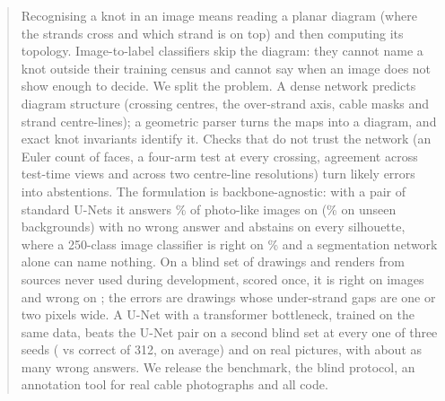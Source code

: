 \begin{abstract}
Recognising a knot in an image means reading a planar diagram (where the strands
cross and which strand is on top) and then computing its topology. Image-to-label
classifiers skip the diagram: they cannot name a knot outside their training census
and cannot say when an image does not show enough to decide. We split the problem.
A dense network predicts diagram structure (crossing centres, the over-strand axis,
cable masks and strand centre-lines); a geometric parser turns the maps into a
diagram, and exact knot invariants identify it. Checks that do not trust the network
(an Euler count of faces, a four-arm test at every crossing, agreement across
test-time views and across two centre-line resolutions) turn likely errors into
abstentions. The formulation is backbone-agnostic: with a pair of standard U-Nets it
answers \UPCov\% of photo-like images on \bench{} (\UPUnseenCov\% on unseen
backgrounds) with no wrong answer and abstains on every silhouette, where a 250-class
image classifier is right on \ClfBenchAcc\% and a segmentation network alone can name
nothing. On a blind set of \BlindN{} drawings and renders from sources never used
during development, scored once, it is right on \UPBlindCorrect{} images and wrong on
\UPBlindWrong{}; the errors are drawings whose under-strand gaps are one or two pixels
wide. A U-Net with a transformer bottleneck, trained on the same data, beats the U-Net pair on a
second blind set at every one of three seeds (\BUUfVtwo{} vs \BUUnetVtwo{} correct of 312, on average) and
on real pictures, with about as many wrong answers. We release the benchmark, the blind protocol, an annotation tool for real cable
photographs and all code.
\end{abstract}
